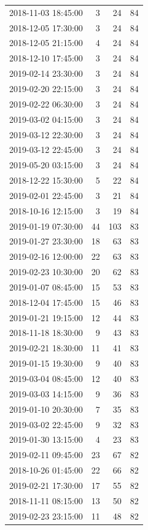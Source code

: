 \begin{tabular}{lrrr}
2018-11-03 18:45:00 & 3 & 24 & 84 \\
2018-12-05 17:30:00 & 3 & 24 & 84 \\
2018-12-05 21:15:00 & 4 & 24 & 84 \\
2018-12-10 17:45:00 & 3 & 24 & 84 \\
2019-02-14 23:30:00 & 3 & 24 & 84 \\
2019-02-20 22:15:00 & 3 & 24 & 84 \\
2019-02-22 06:30:00 & 3 & 24 & 84 \\
2019-03-02 04:15:00 & 3 & 24 & 84 \\
2019-03-12 22:30:00 & 3 & 24 & 84 \\
2019-03-12 22:45:00 & 3 & 24 & 84 \\
2019-05-20 03:15:00 & 3 & 24 & 84 \\
2018-12-22 15:30:00 & 5 & 22 & 84 \\
2019-02-01 22:45:00 & 3 & 21 & 84 \\
2018-10-16 12:15:00 & 3 & 19 & 84 \\
2019-01-19 07:30:00 & 44 & 103 & 83 \\
2019-01-27 23:30:00 & 18 & 63 & 83 \\
2019-02-16 12:00:00 & 22 & 63 & 83 \\
2019-02-23 10:30:00 & 20 & 62 & 83 \\
2019-01-07 08:45:00 & 15 & 53 & 83 \\
2018-12-04 17:45:00 & 15 & 46 & 83 \\
2019-01-21 19:15:00 & 12 & 44 & 83 \\
2018-11-18 18:30:00 & 9 & 43 & 83 \\
2019-02-21 18:30:00 & 11 & 41 & 83 \\
2019-01-15 19:30:00 & 9 & 40 & 83 \\
2019-03-04 08:45:00 & 12 & 40 & 83 \\
2019-03-03 14:15:00 & 9 & 36 & 83 \\
2019-01-10 20:30:00 & 7 & 35 & 83 \\
2019-03-02 22:45:00 & 9 & 32 & 83 \\
2019-01-30 13:15:00 & 4 & 23 & 83 \\
2019-02-11 09:45:00 & 23 & 67 & 82 \\
2018-10-26 01:45:00 & 22 & 66 & 82 \\
2019-02-21 17:30:00 & 17 & 55 & 82 \\
2018-11-11 08:15:00 & 13 & 50 & 82 \\
2019-02-23 23:15:00 & 11 & 48 & 82 \\

\end{tabular}
